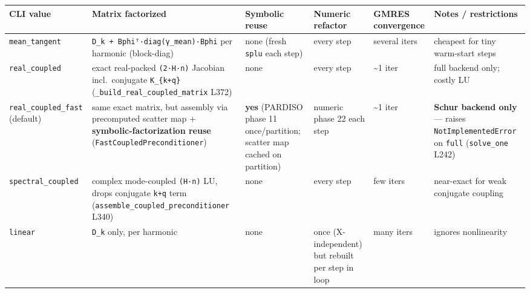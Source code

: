 \documentclass[
  10pt,
]{article}
\newcounter{none} %
\begin{document}
{\def\LTcaptype{none} %
\begin{longtable}[]{@{}
  >{\raggedright\arraybackslash}p{}
  >{\raggedright\arraybackslash}p{}
  >{\raggedright\arraybackslash}p{}
  >{\raggedright\arraybackslash}p{}
  >{\raggedright\arraybackslash}p{}
  >{\raggedright\arraybackslash}p{}@{}}
\toprule\noalign{}
\begin{minipage}[b]{\linewidth}\raggedright
CLI value
\end{minipage} & \begin{minipage}[b]{\linewidth}\raggedright
Matrix factorized
\end{minipage} & \begin{minipage}[b]{\linewidth}\raggedright
Symbolic reuse
\end{minipage} & \begin{minipage}[b]{\linewidth}\raggedright
Numeric refactor
\end{minipage} & \begin{minipage}[b]{\linewidth}\raggedright
GMRES convergence
\end{minipage} & \begin{minipage}[b]{\linewidth}\raggedright
Notes / restrictions
\end{minipage} \\
\midrule\noalign{}
\endhead
\bottomrule\noalign{}
\endlastfoot
\texttt{mean\_tangent} & \texttt{D\_k\ +\ Bphiᵀ·diag(γ\_mean)·Bphi} per
harmonic (block-diag) & none (fresh \texttt{splu} each step) & every
step & several iters & cheapest for tiny warm-start steps \\
\texttt{real\_coupled} & exact real-packed \texttt{(2·H·n)} Jacobian
incl.~conjugate \texttt{K\_\{k+q\}}
(\texttt{\_build\_real\_coupled\_matrix} L372) & none & every step &
\textasciitilde1 iter & full backend only; costly LU \\
\texttt{real\_coupled\_fast} (default) & same exact matrix, but assembly
via precomputed scatter map + \textbf{symbolic-factorization reuse}
(\texttt{FastCoupledPreconditioner}) & \textbf{yes} (PARDISO phase 11
once/partition; scatter map cached on partition) & numeric phase 22 each
step & \textasciitilde1 iter & \textbf{Schur backend only} --- raises
\texttt{NotImplementedError} on \texttt{full} (\texttt{solve\_one}
L242) \\
\texttt{spectral\_coupled} & complex mode-coupled \texttt{(H·n)} LU,
drops conjugate \texttt{k+q} term
(\texttt{assemble\_coupled\_preconditioner} L340) & none & every step &
few iters & near-exact for weak conjugate coupling \\
\texttt{linear} & \texttt{D\_k} only, per harmonic & none & once
(X-independent) but rebuilt per step in loop & many iters & ignores
nonlinearity \\
\end{longtable}
}
\end{document}
